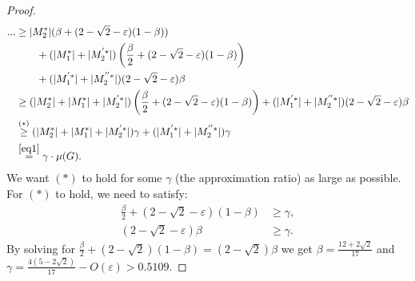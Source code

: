 \documentclass[letterpaper,11pt]{article}
\renewcommand{\epsilon}{\varepsilon}
\begin{document}
\begin{proof}
    \begin{align*}
    ... &\ge \mt (\beta + (2-\sqrt{2}-\epsilon)(1-\beta)) \\&\qquad + (\mo + \mtp) \left( \frac{\beta}{2} + (2-\sqrt{2}-\epsilon)(1-\beta) \right) \\&\qquad + (\mop + \mtpp) (2-\sqrt{2}-\epsilon) \beta
    \\
    &\ge 
    (\mt + \mo + \mtp) \left( \frac{\beta}{2} + (2-\sqrt{2}-\epsilon)(1-\beta) \right) + (\mop + \mtpp) (2-\sqrt{2}-\epsilon) \beta
    \\
    &\stackrel{(*)}{\ge}
    (\mt + \mo + \mtp) \gamma + (\mop + \mtpp) \gamma
    \\
    &\stackrel{\eqref{eq1}}{=} \gamma \cdot \mu(G).
    \end{align*}
    We want $(*)$ to hold for some $\gamma$ (the approximation ratio) as large as possible.
    For $(*)$ to hold, we need to satisfy:
    \begin{align*}
        \frac{\beta}{2} + (2-\sqrt{2}-\epsilon) (1-\beta) &\ge \gamma,\\
        (2-\sqrt{2}-\epsilon) \beta &\ge \gamma.
    \end{align*}
    By solving for $\frac{\beta}{2} + (2-\sqrt{2}) (1-\beta) = (2-\sqrt{2}) \beta$ we get $\beta = \frac{12 + 2 \sqrt{2}}{17}$ and $\gamma = \frac{4(5-2\sqrt{2})}{17} - O(\epsilon) > 0.5109$.
\end{proof}
\end{document}
